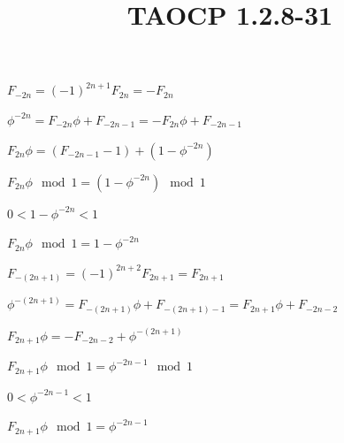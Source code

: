 \documentclass{article}
\title{TAOCP 1.2.8\mbox{-}31}
\begin{document}
\maketitle

\( F_{-2n} = {(-1)}^{2n+1} F_{2n} = -F_{2n} \)

\( \phi^{-2n} = F_{-2n}\phi + F_{-2n-1} = -F_{2n}\phi + F_{-2n-1} \)

\( F_{2n}\phi = (F_{-2n-1} - 1) + (1 - \phi^{-2n}) \)

\( F_{2n}\phi \mod 1 = (1 - \phi^{-2n}) \mod 1 \)

\( 0 < 1 - \phi^{-2n} < 1 \)

\( F_{2n}\phi \mod 1 = 1 - \phi^{-2n} \)

\( F_{-(2n+1)} = {(-1)}^{2n+2} F_{2n+1} = F_{2n+1} \)

\( \phi^{-(2n+1)} = F_{-(2n+1)}\phi + F_{-(2n+1)-1} = F_{2n+1}\phi + F_{-2n-2} \)

\( F_{2n+1}\phi = -F_{-2n-2} + \phi^{-(2n+1)} \)

\( F_{2n+1}\phi \mod 1 = \phi^{-2n-1} \mod 1 \)

\( 0 < \phi^{-2n-1} < 1 \)

\( F_{2n+1}\phi \mod 1 = \phi^{-2n-1} \)
\end{document}
